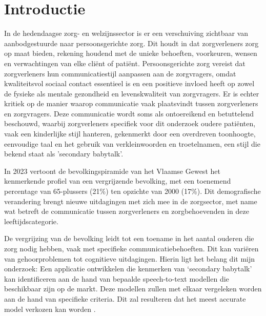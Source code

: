 
\section{Introductie}%
\label{sec:introductie}

In de hedendaagse zorg- en welzijnssector is er een verschuiving zichtbaar van aanbodgestuurde naar persoonsgerichte zorg. Dit houdt in dat zorgverleners zorg op maat bieden, rekening houdend met de unieke behoeften, voorkeuren, wensen en verwachtingen van elke cliënt of patiënt. Persoonsgerichte zorg vereist dat zorgverleners hun communicatiestijl aanpassen aan de zorgvragers, omdat kwaliteitsvol sociaal contact essentieel is en een positieve invloed heeft op zowel de fysieke als mentale gezondheid en levenskwaliteit van zorgvragers.
Er is echter kritiek op de manier waarop communicatie vaak plaatsvindt tussen zorgverleners en zorgvragers. Deze communicatie wordt soms als ontoereikend en betuttelend beschouwd, waarbij zorgverleners specifiek voor dit onderzoek oudere patiënten, vaak een kinderlijke stijl hanteren, gekenmerkt door een overdreven toonhoogte, eenvoudige taal en het gebruik van verkleinwoorden en troetelnamen, een stijl die bekend staat als 'secondary babytalk'.

In 2023 vertoont de bevolkingspiramide van het Vlaamse Gewest het kenmerkende profiel van een vergrijzende bevolking, met een toenemend percentage van 65-plussers (21\%) ten opzichte van 2000 (17\%). Dit demografische verandering brengt nieuwe uitdagingen met zich mee in de zorgsector, met name wat betreft de communicatie tussen zorgverleners en zorgbehoevenden in deze leeftijdscategorie.

De vergrijzing van de bevolking leidt tot een toename in het aantal ouderen die zorg nodig hebben, vaak met specifieke communicatiebehoeften. Dit kan variëren van gehoorproblemen tot cognitieve uitdagingen. Hierin ligt het belang dit mijn onderzoek: Een applicatie ontwikkelen die kenmerken van ‘secondary babytalk’ kan identificeren aan de hand van bepaalde speech-to-text modellen die beschikbaar zijn op de markt. Deze modellen zullen met elkaar vergeleken worden aan de hand van specifieke criteria. Dit zal resulteren dat het meest accurate model verkozen kan worden
\textcite{Vlaanderen.be}.

